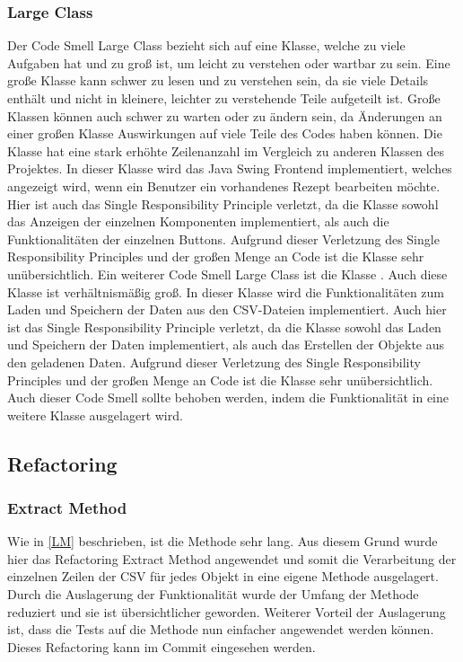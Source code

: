 \subsubsection{Large Class}
Der Code Smell Large Class bezieht sich auf eine Klasse, welche zu viele Aufgaben hat und zu groß ist, um leicht zu verstehen oder wartbar zu sein. Eine große Klasse kann schwer zu lesen und zu verstehen sein, da sie viele Details enthält und nicht in kleinere, leichter zu verstehende Teile aufgeteilt ist. Große Klassen können auch schwer zu warten oder zu ändern sein, da Änderungen an einer großen Klasse Auswirkungen auf viele Teile des Codes haben können. Die Klasse \href{https://github.com/MichaelaHaag/RezeptApp/blob/main/0-Plugins/src/main/java/de/rezeptapp/plugins/gui/RezeptBearbeiten.java}{} hat eine stark erhöhte Zeilenanzahl im Vergleich zu anderen Klassen des Projektes. In dieser Klasse wird das Java Swing Frontend implementiert, welches angezeigt wird, wenn ein Benutzer ein vorhandenes Rezept bearbeiten möchte. Hier ist auch das Single Responsibility Principle verletzt, da die Klasse sowohl das Anzeigen der einzelnen Komponenten implementiert, als auch die Funktionalitäten der einzelnen Buttons. Aufgrund dieser Verletzung des Single Responsibility Principles und der großen Menge an Code ist die Klasse sehr unübersichtlich. Ein weiterer Code Smell Large Class ist die Klasse \href{https://github.com/MichaelaHaag/RezeptApp/blob/main/1-Adapter/src/main/java/de/rezeptapp/adapter/Datenpersistenz/DataReader.java}{}. Auch diese Klasse ist verhältnismäßig groß. In dieser Klasse wird die Funktionalitäten zum Laden und Speichern der Daten aus den CSV-Dateien implementiert. Auch hier ist das Single Responsibility Principle verletzt, da die Klasse sowohl das Laden und Speichern der Daten implementiert, als auch das Erstellen der Objekte aus den geladenen Daten. Aufgrund dieser Verletzung des Single Responsibility Principles und der großen Menge an Code ist die Klasse sehr unübersichtlich. Auch dieser Code Smell sollte behoben werden, indem die Funktionalität in eine weitere Klasse ausgelagert wird.

\subsection{Refactoring}
\subsubsection{Extract Method}
Wie in \autoref{LM} beschrieben, ist die Methode  sehr lang. Aus diesem Grund wurde hier das Refactoring Extract Method angewendet und somit die Verarbeitung der einzelnen Zeilen der CSV für jedes Objekt in eine eigene Methode ausgelagert.
Durch die Auslagerung der Funktionalität wurde der Umfang der Methode reduziert und sie ist übersichtlicher geworden. 
Weiterer Vorteil der Auslagerung ist, dass die Tests auf die Methode nun einfacher angewendet werden können. 
Dieses Refactoring kann im Commit \href{https://github.com/MichaelaHaag/RezeptApp/commit/d3ace6a38e46831cee35d0b270c41c4fd5783162}{} eingesehen werden.

